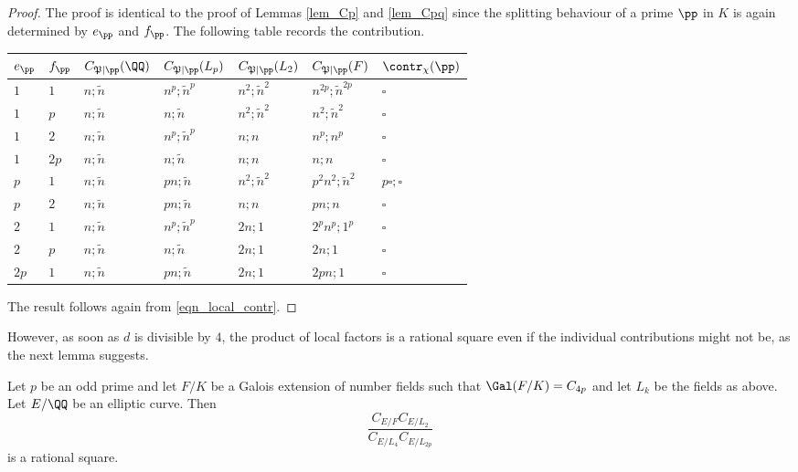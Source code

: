 \begin{proof}
    The proof is identical to the proof of Lemmas \ref*{lem_Cp} and \ref*{lem_Cpq} since the splitting behaviour of a prime $\pp$ in $K$ is again determined by $e_\pp$ and $f_\pp$. The following table records the contribution.

    \begin{table}[!ht]
        \centering
        \begin{tabular}{|l|l|l|l|l|l|l|}
        \hline
        $e_\pp$ & $f_\pp$  & $C_{\mathfrak{P}\mid \pp}(\QQ)$ & $C_{\mathfrak{P}\mid \pp}(L_p)$ & $C_{\mathfrak{P}\mid \pp}(L_2)$ & $C_{\mathfrak{P}\mid \pp}(F)$ & $\contr_\chi(\pp)$ \\ \hline
        $1$ & $1$ & $n;\tilde{n}$ & $n^p;\tilde{n}^p$ & $n^2;\tilde{n}^2$ & $n^{2p};\tilde{n}^{2p}$ & $\square$ \\ \hline
        $1$ & $p$ & $n;\tilde{n}$ & $n;\tilde{n}$ & $n^2;\tilde{n}^2$ & $n^2;\tilde{n}^2$ & $\square$ \\ \hline
        $1$ & $2$ & $n;\tilde{n}$ & $n^p;\tilde{n}^p$ & $n;n$ & $n^p;n^p$ & $\square$ \\ \hline
        $1$ & $2p$ & $n;\tilde{n}$ & $n;\tilde{n}$ & $n;n$ & $n;n$ & $\square$ \\ \hline
        $p$ & $1$ & $n;\tilde{n}$ & $pn;\tilde{n}$ & $n^2;\tilde{n}^2$ & $p^2n^2;\tilde{n}^2$ & $p\square;\square$ \\ \hline
        $p$ & $2$ & $n;\tilde{n}$ & $pn;\tilde{n}$ & $n;n$ & $pn;n$ & $\square$ \\ \hline
        $2$ & $1$ & $n;\tilde{n}$ & $n^p;\tilde{n}^p$ & $2n;1$ & $2^pn^p;1^p$ & $\square$ \\ \hline
        $2$ & $p$ & $n;\tilde{n}$ & $n;\tilde{n}$ & $2n;1$ & $2n;1$ & $\square$ \\ \hline
        $2p$ & $1$ & $n;\tilde{n}$ & $pn;\tilde{n}$ & $2n;1$ & $2pn;1$ & $\square$ \\ \hline
        \end{tabular}
    \end{table}
    The result follows again from \eqref{eqn_local_contr}.

\end{proof}

However, as soon as $d$ is divisible by $4$, the product of local factors is a rational square even if the individual contributions might not be, as the next lemma suggests. 

\begin{lemma}\label{lem_C4p}
    Let $p$ be an odd prime and let $F/K$ be a Galois extension of number fields such that $\Gal(F/K)=C_{4p}$ and let $L_k$ be the fields as above. Let $E/\QQ$ be an elliptic curve. Then
    $$\frac{C_{E/F}C_{E/L_2}}{C_{E/L_4}C_{E/L_{2p}}}$$
    is a rational square.
\end{lemma}

